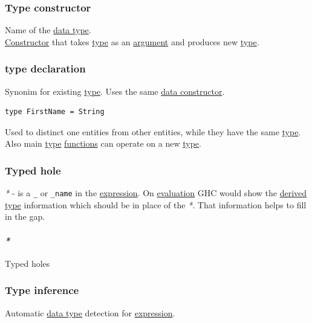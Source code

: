 \documentclass[11pt]{article}
\begin{document}
\subsubsection{\label{org7285f45}Type constructor}
\label{sec:org8db6e4a}
Name of the \hyperref[org965cde3]{data type}.\\

\hyperref[orgd019743]{Constructor} that takes \hyperref[org4fbaeb8]{type} as an \hyperref[orgf66a5f7]{argument} and produces new \hyperref[org4fbaeb8]{type}.\\


\subsubsection{\label{org0ad57a2}type declaration}
\label{sec:org4ab4353}
Synonim for existing \hyperref[org4fbaeb8]{type}. Uses the same \hyperref[org6dad980]{data constructor}.\\
\begin{verbatim}
type FirstName = String
\end{verbatim}
Used to distinct one entities from other entities, while they have the same \hyperref[org4fbaeb8]{type}.\\
Also main \hyperref[org4fbaeb8]{type} \hyperref[org66c5288]{functions} can operate on a new \hyperref[org4fbaeb8]{type}.\\

\subsubsection{\label{org66f69bd}Typed hole}
\label{sec:orgc1c046e}
\emph{*} - is a \texttt{\_} or \texttt{\_name} in the \hyperref[org667db83]{expression}. On \hyperref[org5445907]{evaluation} GHC would show the \hyperref[org0c133f8]{derived} \hyperref[org4fbaeb8]{type} information which should be in place of the \emph{*}. That information helps to fill in the gap.\\

\paragraph{\emph{*}}
\label{sec:orgb31dc0e}

\label{org6a09380}Typed holes\\

\subsubsection{\label{orgf4f2545}Type inference}
\label{sec:orgb051b9f}
Automatic \hyperref[org965cde3]{data type} detection for \hyperref[org667db83]{expression}.\\
\end{document}
